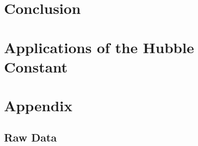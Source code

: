 \documentclass[12pt]{article}
\begin{document}
\section{Conclusion}



\section{Applications of the Hubble Constant}




\newpage






\newpage

\section*{Appendix}

\subsection*{Raw Data}

\listoffigures
\end{document}
